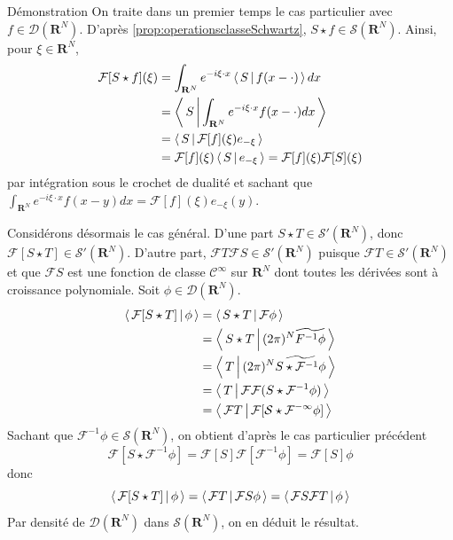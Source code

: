         \begin{demo}{Démonstration}
            On traite dans un premier temps le cas particulier avec $f \in \mathcal{D}(\mathbf{R}^N)$. D’après \ref{prop:operationsclasseSchwartz}, $S \star f \in \mathcal{S}(\mathbf{R}^N)$. Ainsi, pour $\xi \in \mathbf{R}^N$,
            \begin{align*}
                \mathcal{F}[S \star f](\xi)
                &= \int_{\mathbf{R}^N} e^{- i \xi \cdot x} \left< \, S \, \middle| \, f(x - \cdot) \, \right> dx \\
                &= \left< \, S \, \middle| \, \int_{\mathbf{R}^N} e^{-i \xi \cdot x} f(x - \cdot) dx \, \right> \\
                &= \left< \, S \, \middle| \, \mathcal{F}[f](\xi) e_{- \xi} \, \right> \\
                &= \mathcal{F}[f](\xi) \left< \, S \, \middle| \, e_{-\xi} \, \right> = \mathcal{F}[f](\xi) \mathcal{F}[S](\xi) 
            \end{align*}
            par intégration sous le crochet de dualité et sachant que $\int_{\mathbf{R}^N} e^{- i \xi \cdot x} f(x - y)dx = \mathcal{F}[f](\xi)e_{-\xi}(y)$.

            Considérons désormais le cas général. D’une part $S \star T \in \mathcal{S}'(\mathbf{R}^N)$, donc $\mathcal{F}[S \star T] \in \mathcal{S}'(\mathbf{R}^N)$. D’autre part, $\mathcal{F}T \mathcal{F}S \in \mathcal{S}'(\mathbf{R}^N)$ puisque $\mathcal{F}T \in \mathcal{S}'(\mathbf{R}^N)$ et que $\mathcal{F}S$ est une fonction de classe $\mathcal{C}^{\infty}$ sur $\mathbf{R}^N$ dont toutes les dérivées sont à croissance polynomiale. Soit $\phi \in \mathcal{D}(\mathbf{R}^N)$.
            \begin{align*}
                \left< \, \mathcal{F}[S \star T] \, \middle| \, \phi \, \right> 
                &= \left< \, S \star T \, \middle| \, \mathcal{F}\phi \, \right> \\
                &= \left< \, S \star T \, \middle| \, (2\pi)^N \widetilde{F^{-1}\phi} \, \right> \\
                &= \left< \, T \, \middle| \, (2\pi)^N \widetilde{S \star \mathcal{F}^{-1} \phi} \, \right> \\
                &= \left< \, T \, \middle| \, \mathcal{F}\mathcal{F}(S \star \mathcal{F}^{-1}\phi) \, \right> \\ 
                &= \left< \, \mathcal{F}T \, \middle| \, \mathcal{F}[\mathcal{S \star \mathcal{F}^{-1}\phi}] \, \right> \\
            \end{align*}
            Sachant que $\mathcal{F}^{-1}\phi \in \mathcal{S}(\mathbf{R}^N)$, on obtient d’après le cas particulier précédent 
            \[ \mathcal{F}[S \star \mathcal{F}^{-1}\phi] = \mathcal{F}[S] \mathcal{F}[\mathcal{F}^{-1}\phi] = \mathcal{F}[S] \phi \]   
            donc 
            \[ \left< \, \mathcal{F}[S \star T] \, \middle| \, \phi \, \right> = \left< \, \mathcal{F}T \, \middle| \, \mathcal{F}S \phi \, \right> = \left< \, \mathcal{F}S \mathcal{F}T \, \middle| \, \phi \, \right> \]   
            Par densité de $\mathcal{D}(\mathbf{R}^N)$ dans $\mathcal{S}(\mathbf{R}^N)$, on en déduit le résultat.
        \end{demo}


        